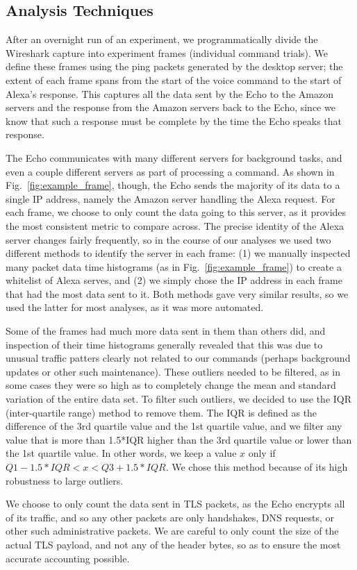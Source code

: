 \subsection{Analysis Techniques}

After an overnight run of an experiment, we programmatically divide the Wireshark capture into experiment frames (individual command trials). We define these frames using the ping packets generated by the desktop server; the extent of each frame spans from the start of the voice command to the start of Alexa's response. This captures all the data sent by the Echo to the Amazon servers and the response from the Amazon servers back to the Echo, since we know that such a response must be complete by the time the Echo speaks that response.

The Echo communicates with many different servers for background tasks, and even a couple different servers as part of processing a command. As shown in Fig.~\ref{fig:example_frame}, though, the Echo sends the majority of its data to a single IP address, namely the Amazon server handling the Alexa request. For each frame, we choose to only count the data going to this server, as it provides the most consistent metric to compare across. The precise identity of the Alexa server changes fairly frequently, so in the course of our analyses we used two different methods to identify the server in each frame: (1) we manually inspected many packet data time histograms (as in Fig.~\ref{fig:example_frame}) to create a whitelist of Alexa serves, and (2) we simply chose the IP address in each frame that had the most data sent to it. Both methods gave very similar results, so we used the latter for most analyses, as it was more automated.

Some of the frames had much more data sent in them than others did, and inspection of their time histograms generally revealed that this was due to unusual traffic patters clearly not related to our commands (perhaps background updates or other such maintenance). These outliers needed to be filtered, as in some cases they were so high as to completely change the mean and standard variation of the entire data set. To filter such outliers, we decided to use the IQR (inter-quartile range) method to remove them. The IQR is defined as the difference of the 3rd quartile value and the 1st quartile value, and we filter any value that is more than 1.5*IQR higher than the 3rd quartile value or lower than the 1st quartile value. In other words, we keep a value $x$ only if $Q1 - 1.5*IQR < x < Q3 + 1.5*IQR$. We chose this method because of its high robustness to large outliers.

We choose to only count the data sent in TLS packets, as the Echo encrypts all of its traffic, and so any other packets are only handshakes, DNS requests, or other such administrative packets. We are careful to only count the size of the actual TLS payload, and not any of the header bytes, so as to ensure the most accurate accounting possible.



